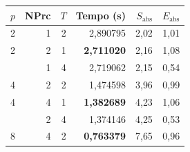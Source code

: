 \begin{tabular}{@{}rrrrrr@{}}
\toprule
$p$ & NPrc & $T$ & Tempo (s) & $S_\text{abs}$ & $E_\text{abs}$ \\
\midrule
2 & 1 & 2 & 2{,}890795 & 2{,}02 & 1{,}01 \\
2 & 2 & 1 & \textbf{2{,}711020} & 2{,}16 & 1{,}08 \\
\addlinespace
4 & 1 & 4 & 2{,}719062 & 2{,}15 & 0{,}54 \\
4 & 2 & 2 & 1{,}474598 & 3{,}96 & 0{,}99 \\
4 & 4 & 1 & \textbf{1{,}382689} & 4{,}23 & 1{,}06 \\
\addlinespace
8 & 2 & 4 & 1{,}374146 & 4{,}25 & 0{,}53 \\
8 & 4 & 2 & \textbf{0{,}763379} & 7{,}65 & 0{,}96 \\
\bottomrule
\end{tabular}
